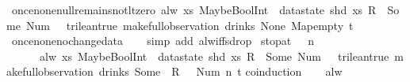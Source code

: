 \begin{isabellebody}
{\isafoldproof}%
%
\isadelimproof
\isanewline
%
\endisadelimproof
\isanewline
{}\isamarkupfalse%
\ once{\isacharunderscore}none{\isacharunderscore}null{\isacharunderscore}remains{\isacharunderscore}not{\isacharunderscore}lt{\isacharunderscore}zero{\isacharcolon}\ {\isachardoublequoteopen}alw\ {\isacharparenleft}{\isasymlambda}xs{\isachardot}\ MaybeBoolInt\ {\isacharparenleft}{\isacharless}{\isacharparenright}\ {\isacharparenleft}datastate\ {\isacharparenleft}shd\ xs{\isacharparenright}\ {\isacharparenleft}R\ {}{\isacharparenright}{\isacharparenright}\ {\isacharparenleft}Some\ {\isacharparenleft}Num\ {}{\isacharparenright}{\isacharparenright}\ {\isasymnoteq}\ trilean{\isachardot}true{\isacharparenright}\ {\isacharparenleft}make{\isacharunderscore}full{\isacharunderscore}observation\ drinks\ None\ Map{\isachardot}empty\ t{\isacharparenright}{\isachardoublequoteclose}\isanewline
%
\isadelimproof
\ \ %
\endisadelimproof
%
\isatagproof
{}\isamarkupfalse%
\ once{\isacharunderscore}none{\isacharunderscore}no{\isacharunderscore}change{\isacharunderscore}data\isanewline
\ \ \isamarkupfalse%
\ {\isacharparenleft}simp\ add{\isacharcolon}\ alw{\isacharunderscore}iff{\isacharunderscore}sdrop{\isacharparenright}%
\endisatagproof
{\isafoldproof}%
%
\isadelimproof
\isanewline
%
\endisadelimproof
\isanewline
{}\isamarkupfalse%
\ stop{\isacharunderscore}at{\isacharunderscore}{}{\isacharcolon}\ {\isachardoublequoteopen}{}\ {\isasymle}\ n\ {\isasymLongrightarrow}\isanewline
\ \ \ \ \ \ alw\ {\isacharparenleft}{\isasymlambda}xs{\isachardot}\ MaybeBoolInt\ {\isacharparenleft}{\isacharless}{\isacharparenright}\ {\isacharparenleft}datastate\ {\isacharparenleft}shd\ xs{\isacharparenright}\ {\isacharparenleft}R\ {}{\isacharparenright}{\isacharparenright}\ {\isacharparenleft}Some\ {\isacharparenleft}Num\ {}{\isacharparenright}{\isacharparenright}\ {\isasymnoteq}\ trilean{\isachardot}true{\isacharparenright}\ {\isacharparenleft}make{\isacharunderscore}full{\isacharunderscore}observation\ drinks\ {\isacharparenleft}Some\ {}{\isacharparenright}\ {\isacharless}R\ {}\ {\isacharcolon}{\isacharequal}\ Num\ n{\isachargreater}\ t{\isacharparenright}{\isachardoublequoteclose}\isanewline
%
\isadelimproof
%
\endisadelimproof
%
\isatagproof
{}\isamarkupfalse%
{\isacharparenleft}coinduction{\isacharparenright}\isanewline
\ \ \isamarkupfalse%
\ alw\isanewline
\ \ \isamarkupfalse%
\ \isamarkupfalse%

\end{isabellebody}
